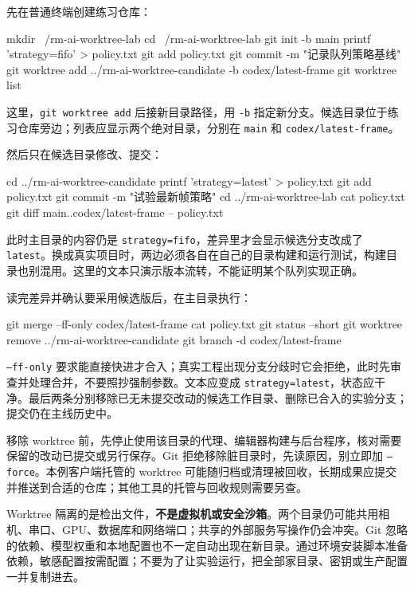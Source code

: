 \begin{example}[用两个目录保留稳定版与候选版]
先在普通终端创建练习仓库：
\begin{tbash}
mkdir ~/rm-ai-worktree-lab
cd ~/rm-ai-worktree-lab
git init -b main
printf 'strategy=fifo\n' > policy.txt
git add policy.txt
git commit -m "记录队列策略基线"
git worktree add ../rm-ai-worktree-candidate -b codex/latest-frame
git worktree list
\end{tbash}
这里，\texttt{git worktree add} 后接新目录路径，用 \texttt{-b} 指定新分支。候选目录位于练习仓库旁边；列表应显示两个绝对目录，分别在 \texttt{main} 和 \texttt{codex/latest-frame}。

然后只在候选目录修改、提交：
\begin{tbash}
cd ../rm-ai-worktree-candidate
printf 'strategy=latest\n' > policy.txt
git add policy.txt
git commit -m "试验最新帧策略"
cd ../rm-ai-worktree-lab
cat policy.txt
git diff main..codex/latest-frame -- policy.txt
\end{tbash}
此时主目录的内容仍是 \texttt{strategy=fifo}，差异里才会显示候选分支改成了 \texttt{latest}。换成真实项目时，两边必须各自在自己的目录构建和运行测试，构建目录也别混用。这里的文本只演示版本流转，不能证明某个队列实现正确。

读完差异并确认要采用候选版后，在主目录执行：
\begin{tbash}
git merge --ff-only codex/latest-frame
cat policy.txt
git status --short
git worktree remove ../rm-ai-worktree-candidate
git branch -d codex/latest-frame
\end{tbash}
\texttt{--ff-only} 要求能直接快进才合入；真实工程出现分支分歧时它会拒绝，此时先审查并处理合并，不要照抄强制参数。文本应变成 \texttt{strategy=latest}，状态应干净。最后两条分别移除已无未提交改动的候选工作目录、删除已合入的实验分支；提交仍在主线历史中。
\end{example}

\begin{note}
移除 worktree 前，先停止使用该目录的代理、编辑器构建与后台程序，核对需要保留的改动已提交或另行保存。Git 拒绝移除脏目录时，先读原因，别立即加 \texttt{--force}。本例客户端托管的 worktree 可能随归档或清理被回收，长期成果应提交并推送到合适的仓库；其他工具的托管与回收规则需要另查。
\end{note}

Worktree 隔离的是检出文件，\textbf{不是虚拟机或安全沙箱}。两个目录仍可能共用相机、串口、GPU、数据库和网络端口；共享的外部服务写操作仍会冲突。Git 忽略的依赖、模型权重和本地配置也不一定自动出现在新目录。通过环境安装脚本准备依赖，敏感配置按需配置；不要为了让实验运行，把全部家目录、密钥或生产配置一并复制进去。

